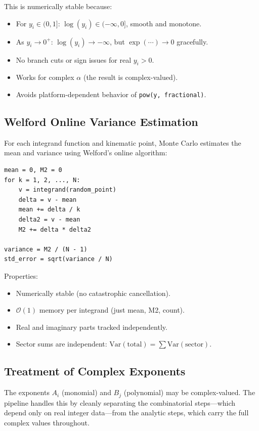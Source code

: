 \documentclass[11pt,a4paper]{article}
\begin{document}
This is numerically stable because:
\begin{itemize}
  \item For $y_i \in (0,1]$: $\log(y_i) \in (-\infty, 0]$, smooth and monotone.
  \item As $y_i \to 0^+$: $\log(y_i) \to -\infty$, but $\exp(\cdots) \to 0$ gracefully.
  \item No branch cuts or sign issues for real $y_i > 0$.
  \item Works for complex $\alpha$ (the result is complex-valued).
  \item Avoids platform-dependent behavior of \texttt{pow(y, fractional)}.
\end{itemize}

\subsection{Welford Online Variance Estimation}\label{sec:alg-welford}

For each integrand function and kinematic point, Monte Carlo estimates the mean and variance using Welford's online algorithm:
\begin{lstlisting}
mean = 0, M2 = 0
for k = 1, 2, ..., N:
    v = integrand(random_point)
    delta = v - mean
    mean += delta / k
    delta2 = v - mean
    M2 += delta * delta2

variance = M2 / (N - 1)
std_error = sqrt(variance / N)
\end{lstlisting}

Properties:
\begin{itemize}
  \item Numerically stable (no catastrophic cancellation).
  \item $\mathcal{O}(1)$ memory per integrand (just mean, M2, count).
  \item Real and imaginary parts tracked independently.
  \item Sector sums are independent: $\mathrm{Var}(\mathrm{total}) = \sum \mathrm{Var}(\mathrm{sector})$.
\end{itemize}

\subsection{Treatment of Complex Exponents}\label{sec:complex-exponents}

The exponents $A_i$ (monomial) and $B_j$ (polynomial) may be complex-valued.
The pipeline handles this by cleanly separating the combinatorial steps---which
depend only on real integer data---from the analytic steps, which carry the full
complex values throughout.
\end{document}
